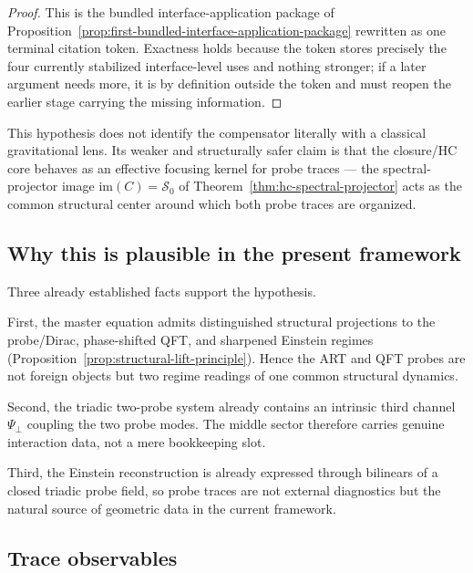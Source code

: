 \begin{proof}
This is the bundled interface-application package of Proposition~\ref{prop:first-bundled-interface-application-package} rewritten as one terminal citation token. Exactness holds because the token stores precisely the four currently stabilized interface-level uses and nothing stronger; if a later argument needs more, it is by definition outside the token and must reopen the earlier stage carrying the missing information.
\end{proof}











\begin{remark}
This hypothesis does not identify the compensator literally with a
classical gravitational lens. Its weaker and structurally safer claim
is that the closure/HC core behaves as an effective focusing kernel for
probe traces --- the spectral-projector image $\mathrm{im}(C) =
\mathcal{S}_0$ of Theorem~\ref{thm:hc-spectral-projector} acts as the
common structural center around which both probe traces are organized.
\end{remark}

\subsection*{Why this is plausible in the present framework}

Three already established facts support the hypothesis.

First, the master equation admits distinguished structural projections to
the probe/Dirac, phase-shifted QFT, and sharpened Einstein regimes
(Proposition~\ref{prop:structural-lift-principle}). Hence the ART and QFT
probes are not foreign objects but two regime readings of one common
structural dynamics.

Second, the triadic two-probe system already contains an intrinsic third
channel $\Psi_\perp$ coupling the two probe modes. The middle sector
therefore carries genuine interaction data, not a mere bookkeeping slot.

Third, the Einstein reconstruction is already expressed through bilinears
of a closed triadic probe field, so probe traces are not external
diagnostics but the natural source of geometric data in the current
framework.

\subsection*{Trace observables}

